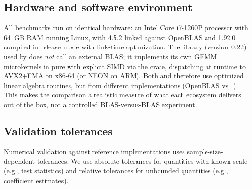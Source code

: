 \subsection{Hardware and software environment}

All benchmarks run on identical hardware: an Intel Core i7-1260P processor
with 64~GB RAM running Linux, with  4.5.2 linked against
OpenBLAS and  1.92.0 compiled in release mode with
link-time optimization. The  library (version~0.22) used by
 does \emph{not} call an external BLAS; it implements its
own GEMM microkernels in pure  with explicit SIMD via
the  crate, dispatching at runtime to AVX2+FMA on x86-64
(or NEON on ARM). Both  and  therefore
use optimized linear algebra routines, but from different
implementations (OpenBLAS vs.\ ). This makes the
comparison a realistic measure of what each ecosystem delivers out of
the box, not a controlled BLAS-versus-BLAS experiment.

\subsection{Validation tolerances} \label{app:validation-tolerances}

Numerical validation against  reference implementations uses
sample-size-dependent tolerances. We use absolute tolerances for quantities
with known scale (e.g., test statistics) and relative tolerances for
unbounded quantities (e.g., coefficient estimates).

